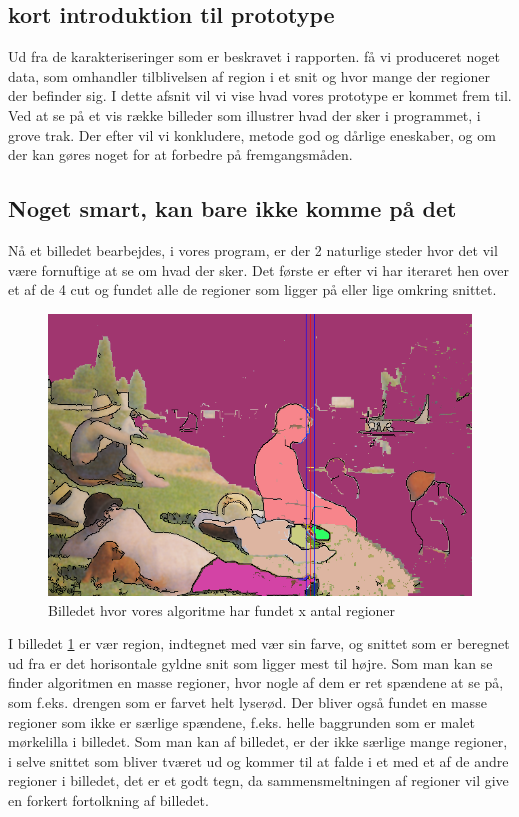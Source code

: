 \subsection{kort introduktion til prototype}
Ud fra de karakteriseringer som er beskravet i rapporten. få vi
produceret noget data, som omhandler tilblivelsen af region i et snit og
hvor mange der regioner der befinder sig. I dette afsnit vil vi vise
hvad vores prototype er kommet frem til. Ved at se på et vis række billeder
som illustrer hvad der sker i programmet, i grove trak. Der efter vil vi
konkludere, metode god og dårlige eneskaber, og om der kan gøres noget for at
forbedre på fremgangsmåden.


\subsection{Noget smart, kan bare ikke komme på det}
Nå et billedet bearbejdes, i vores program, er der 2 naturlige steder
hvor det vil være fornuftige at se om hvad der sker. Det første er efter vi har
iteraret hen over et af de 4 cut og fundet alle de regioner som ligger
på eller lige omkring snittet.

\begin{figure}[h!!]
	\begin{center}
		\includegraphics[scale=0.42,angle=0]{afsnit/afprovning/billeder/floodfillbilledet.png}
	\end{center}
	\caption[]{Billedet hvor vores algoritme har fundet x antal regioner}
	\label{ff}
\end{figure}

I billedet \ref{ff} er vær region, indtegnet med vær sin farve, og snittet
som er beregnet ud fra er det horisontale gyldne snit som ligger mest
til højre. Som man kan se finder algoritmen en masse regioner, hvor
nogle af dem er ret spændene at se på, som f.eks. drengen som er farvet
helt lyserød. Der bliver også fundet en masse regioner som ikke er
særlige spændene, f.eks. helle baggrunden som er malet mørkelilla i
billedet. Som man kan af billedet, er der ikke særlige mange regioner, i
selve snittet som bliver tværet ud og kommer til at falde i et med et af
de andre regioner i billedet, det er et godt tegn, da sammensmeltningen af
regioner vil give en forkert fortolkning af billedet.

